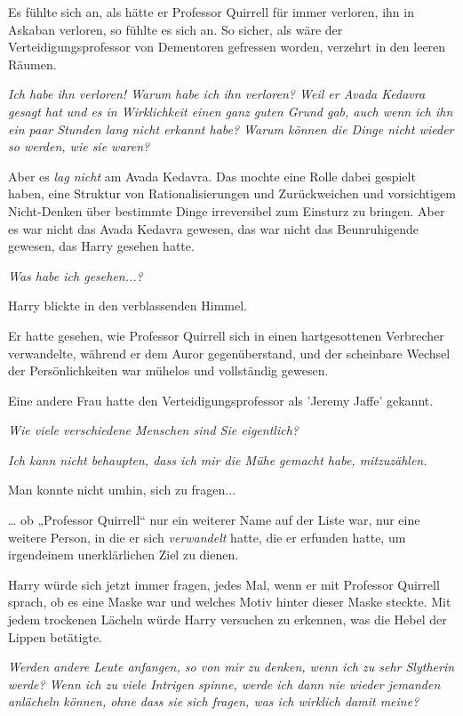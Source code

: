 {Es fühlte sich an, als hätte er Professor Quirrell für immer verloren, ihn in Askaban verloren, so fühlte es sich an. So sicher, als wäre der Verteidigungsprofessor von Dementoren gefressen worden, verzehrt in den leeren Räumen.

\emph{\emph{Ich habe ihn verloren! Warum habe ich ihn verloren? Weil er Avada Kedavra gesagt hat und es in Wirklichkeit einen ganz guten Grund gab, auch wenn ich ihn ein paar Stunden lang nicht erkannt habe? Warum können die Dinge nicht wieder so werden, wie sie waren?}}

Aber es \emph{lag nicht} am Avada Kedavra. Das mochte eine Rolle dabei gespielt haben, eine Struktur von Rationalisierungen und Zurückweichen und vorsichtigem Nicht-Denken über bestimmte Dinge irreversibel zum Einsturz zu bringen. Aber es war nicht das Avada Kedavra gewesen, das war nicht das Beunruhigende gewesen, das Harry gesehen hatte.

\emph{\emph{Was habe ich gesehen...?}}

Harry blickte in den verblassenden Himmel.

Er hatte gesehen, wie Professor Quirrell sich in einen hartgesottenen Verbrecher verwandelte, während er dem Auror gegenüberstand, und der scheinbare Wechsel der Persönlichkeiten war mühelos und vollständig gewesen.

Eine andere Frau hatte den Verteidigungsprofessor als 'Jeremy Jaffe' gekannt.

\emph{\emph{Wie viele verschiedene Menschen sind Sie eigentlich?}}

\emph{\emph{Ich kann nicht behaupten, dass ich mir die Mühe gemacht habe, mitzuzählen.}}

Man konnte nicht umhin, sich zu fragen...

… ob „Professor Quirrell“ nur ein weiterer Name auf der Liste war, nur eine weitere Person, in die er sich \emph{verwandelt} hatte, die er erfunden hatte, um irgendeinem unerklärlichen Ziel zu dienen.

Harry würde sich jetzt immer fragen, jedes Mal, wenn er mit Professor Quirrell sprach, ob es eine Maske war und welches Motiv hinter dieser Maske steckte. Mit jedem trockenen Lächeln würde Harry versuchen zu erkennen, was die Hebel der Lippen betätigte.

\emph{\emph{Werden andere Leute anfangen, so von mir zu denken, wenn ich zu sehr Slytherin werde? Wenn ich zu viele Intrigen spinne, werde ich dann nie wieder jemanden anlächeln können, ohne dass sie sich fragen, was ich wirklich damit meine?}}

}
